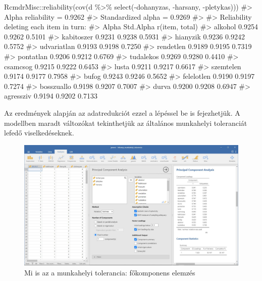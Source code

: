 \documentclass[
  letterpaper,
]{krantz}
\makeatletter
\newenvironment{Shaded}{\begin{snugshade}}{\end{snugshade}}
\newcommand{\CommentTok}[1]{\textcolor[rgb]{0.37,0.37,0.37}{#1}}
\newcommand{\FunctionTok}[1]{\textcolor[rgb]{0.28,0.35,0.67}{#1}}
\newcommand{\NormalTok}[1]{\textcolor[rgb]{0.00,0.23,0.31}{#1}}
\newcommand{\SpecialCharTok}[1]{\textcolor[rgb]{0.37,0.37,0.37}{#1}}
\newenvironment{kframe}{%
\medskip{}
\setlength{\fboxsep}{.8em}
 \def\at@end@of@kframe{}%
 \ifinner\ifhmode%
  \def\at@end@of@kframe{\end{minipage}}%
  \begin{minipage}{\columnwidth}%
 \fi\fi%
 \def\FrameCommand##1{\hskip\@totalleftmargin \hskip-\fboxsep
 \colorbox{shadecolor}{##1}\hskip-\fboxsep
     \hskip-\linewidth \hskip-\@totalleftmargin \hskip\columnwidth}%
 \MakeFramed {\advance\hsize-\width
   \@totalleftmargin\z@ \linewidth\hsize
   \@setminipage}}%
 {\par\unskip\endMakeFramed%
 \at@end@of@kframe}
\renewenvironment{Shaded}{\begin{kframe}}{\end{kframe}}
\makeatother
\begin{document}
\begin{Shaded}
\begin{Highlighting}[]
\NormalTok{RcmdrMisc}\SpecialCharTok{::}\FunctionTok{reliability}\NormalTok{(}\FunctionTok{cov}\NormalTok{(d }\SpecialCharTok{\%\textgreater{}\%}
    \FunctionTok{select}\NormalTok{(}\SpecialCharTok{{-}}\NormalTok{dohanyzas, }\SpecialCharTok{{-}}\NormalTok{harsany, }\SpecialCharTok{{-}}\NormalTok{pletykas)))}
\CommentTok{\#\textgreater{} Alpha reliability =  0.9262 }
\CommentTok{\#\textgreater{} Standardized alpha =  0.9269 }
\CommentTok{\#\textgreater{} }
\CommentTok{\#\textgreater{} Reliability deleting each item in turn:}
\CommentTok{\#\textgreater{}              Alpha Std.Alpha r(item, total)}
\CommentTok{\#\textgreater{} alkohol     0.9254    0.9262         0.5101}
\CommentTok{\#\textgreater{} kabitoszer  0.9231    0.9238         0.5931}
\CommentTok{\#\textgreater{} hianyzik    0.9236    0.9242         0.5752}
\CommentTok{\#\textgreater{} udvariatlan 0.9193    0.9198         0.7250}
\CommentTok{\#\textgreater{} rendetlen   0.9189    0.9195         0.7319}
\CommentTok{\#\textgreater{} pontatlan   0.9206    0.9212         0.6769}
\CommentTok{\#\textgreater{} tudalekos   0.9269    0.9280         0.4410}
\CommentTok{\#\textgreater{} csamcsog    0.9215    0.9222         0.6453}
\CommentTok{\#\textgreater{} lusta       0.9211    0.9217         0.6617}
\CommentTok{\#\textgreater{} szemtelen   0.9174    0.9177         0.7958}
\CommentTok{\#\textgreater{} bufog       0.9243    0.9246         0.5652}
\CommentTok{\#\textgreater{} felelotlen  0.9190    0.9197         0.7274}
\CommentTok{\#\textgreater{} bosszuallo  0.9198    0.9207         0.7007}
\CommentTok{\#\textgreater{} durva       0.9200    0.9208         0.6947}
\CommentTok{\#\textgreater{} agressziv   0.9194    0.9202         0.7133}
\end{Highlighting}
\end{Shaded}

Az eredmények alapján az adatredukciót ezzel a lépéssel be is
fejezhetjük. A modellben maradt változókat tekinthetjük az általános
munkahelyi toleranciát lefedő viselkedéseknek.

\begin{figure}

{\centering \includegraphics{./images/fokomp_munkahelyi_tolarencia_kep_01.jpg}

}

\caption{Mi is az a munkahelyi tolerancia: főkomponens elemzés}

\end{figure}
\end{document}
